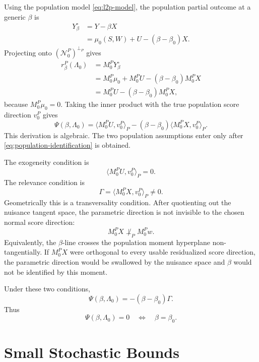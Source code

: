 \documentclass[12pt]{article}
\numberwithin{equation}{section}
\theoremstyle{definition}
\newcommand{\N}{\mathcal N}
\newcommand{\innerP}[2]{\langle #1,#2\rangle_P}
\begin{document}
Using the population model \eqref{eq:l2p-model}, the population partial outcome
at a generic \(\beta\) is
\[
\begin{aligned}
    Y_\beta^\circ
    &=Y-\beta X \\
    &=\mu_0(S,W)+U-(\beta-\beta_0)X.
\end{aligned}
\]
Projecting onto \((\N_0^P)^{\perp_P}\) gives
\begin{equation}
\begin{aligned}
    r_\beta^P(\Lambda_0)
    &=M_0^PY_\beta^\circ \\
    &=M_0^P\mu_0+M_0^PU-(\beta-\beta_0)M_0^PX \\
    &=M_0^PU-(\beta-\beta_0)M_0^PX,
\end{aligned}
\label{eq:population-profiled-residual-identity}
\end{equation}
because \(M_0^P\mu_0=0\). Taking the inner product with the true population
score direction \(v_0^P\) gives
\begin{equation}
    \Psi(\beta,\Lambda_0)
    =\innerP{M_0^PU}{v_0^P}
     -(\beta-\beta_0)\innerP{M_0^PX}{v_0^P}.
    \label{eq:population-identification}
\end{equation}
This derivation is algebraic. The two population assumptions enter only after
\eqref{eq:population-identification} is obtained.

The exogeneity condition is
\[
    \innerP{M_0^PU}{v_0^P}=0.
\]
The relevance condition is
\[
    \Gamma=\innerP{M_0^PX}{v_0^P}\ne0.
\]
Geometrically this is a transversality condition. After quotienting out the
nuisance tangent space, the parametric direction is not invisible to the chosen
normal score direction:
\[
    M_0^PX\not\perp_P M_0^Pw.
\]
Equivalently, the \(\beta\)-line crosses the population moment hyperplane
non-tangentially. If \(M_0^PX\) were orthogonal to every usable residualized
score direction, the parametric direction would be swallowed by the nuisance
space and \(\beta\) would not be identified by this moment.

Under these two conditions,
\[
    \Psi(\beta,\Lambda_0)=-(\beta-\beta_0)\Gamma.
\]
Thus
\begin{equation}
    \Psi(\beta,\Lambda_0)=0
    \quad\Longleftrightarrow\quad
    \beta=\beta_0.
    \label{eq:unique-identification}
\end{equation}
\part{Small Stochastic Bounds}
\end{document}

